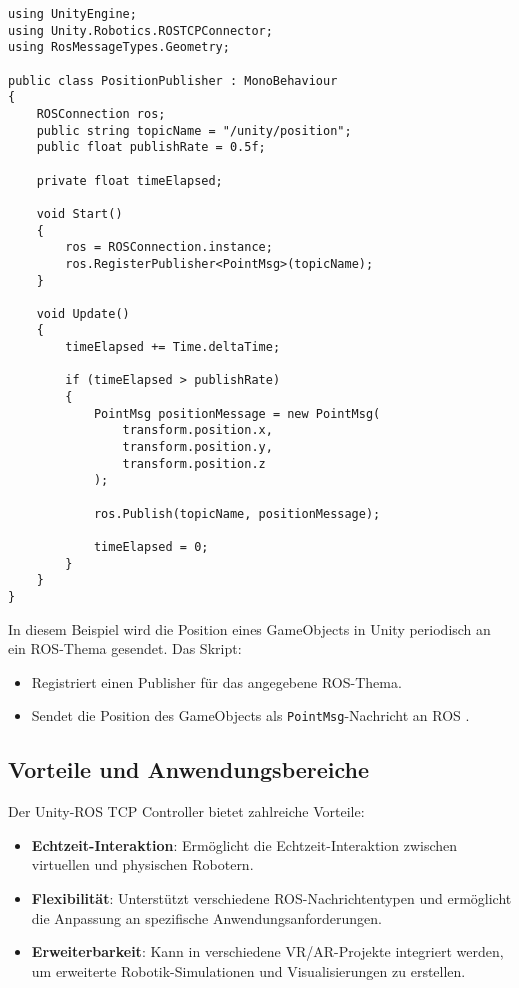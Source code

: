 \begin{verbatim}
using UnityEngine;
using Unity.Robotics.ROSTCPConnector;
using RosMessageTypes.Geometry;

public class PositionPublisher : MonoBehaviour
{
    ROSConnection ros;
    public string topicName = "/unity/position";
    public float publishRate = 0.5f;

    private float timeElapsed;

    void Start()
    {
        ros = ROSConnection.instance;
        ros.RegisterPublisher<PointMsg>(topicName);
    }

    void Update()
    {
        timeElapsed += Time.deltaTime;

        if (timeElapsed > publishRate)
        {
            PointMsg positionMessage = new PointMsg(
                transform.position.x,
                transform.position.y,
                transform.position.z
            );

            ros.Publish(topicName, positionMessage);

            timeElapsed = 0;
        }
    }
}
\end{verbatim}
\noindent
In diesem Beispiel wird die Position eines GameObjects in Unity periodisch an ein ROS-Thema gesendet. Das Skript:

\begin{itemize}
    \item Registriert einen Publisher für das angegebene ROS-Thema.
    \item Sendet die Position des GameObjects als \texttt{PointMsg}-Nachricht an ROS \cite{unity_ros_tcp_connector}.
\end{itemize}

\subsection{Vorteile und Anwendungsbereiche}

Der Unity-ROS TCP Controller bietet zahlreiche Vorteile:

\begin{itemize}
    \item \textbf{Echtzeit-Interaktion}: Ermöglicht die Echtzeit-Interaktion zwischen virtuellen und physischen Robotern.
    \item \textbf{Flexibilität}: Unterstützt verschiedene ROS-Nachrichtentypen und ermöglicht die Anpassung an spezifische Anwendungsanforderungen.
    \item \textbf{Erweiterbarkeit}: Kann in verschiedene VR/AR-Projekte integriert werden, um erweiterte Robotik-Simulationen und Visualisierungen zu erstellen.
\end{itemize}

